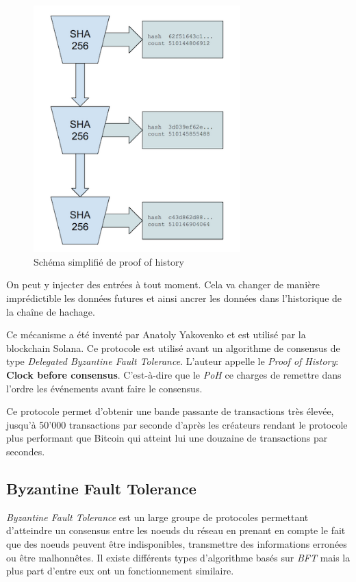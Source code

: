 \begin{figure}[H]
    \centering
    \includegraphics[width=8cm]{images/solana}
    \caption{Schéma simplifié de proof of history}
\end{figure}

On peut y injecter des entrées à tout moment. Cela va changer de manière imprédictible les données futures et ainsi ancrer les données dans l'historique de la chaîne de hachage.

Ce mécanisme a été inventé par Anatoly Yakovenko et est utilisé par la blockchain Solana. Ce protocole est utilisé avant un algorithme de consensus de type \emph{Delegated Byzantine Fault Tolerance}. L'auteur appelle le \emph{Proof of History}: \textbf{Clock before consensus}. C'est-à-dire que le \emph{PoH} ce charges de remettre dans l'ordre les événements avant faire le consensus.

Ce protocole permet d'obtenir une bande passante de transactions très élevée, jusqu'à 50'000 transactions par seconde d'après les créateurs rendant le protocole plus performant que Bitcoin qui atteint lui une douzaine de transactions par secondes.

\subsection{Byzantine Fault Tolerance}

\textit{Byzantine Fault Tolerance} est un large groupe de protocoles permettant d'atteindre un consensus entre les noeuds du réseau en prenant en compte le fait que des noeuds peuvent être indisponibles, transmettre des informations erronées ou être malhonnêtes. Il existe différents types d'algorithme basés sur \textit{BFT} mais la plus part d'entre eux ont un fonctionnement similaire. 

